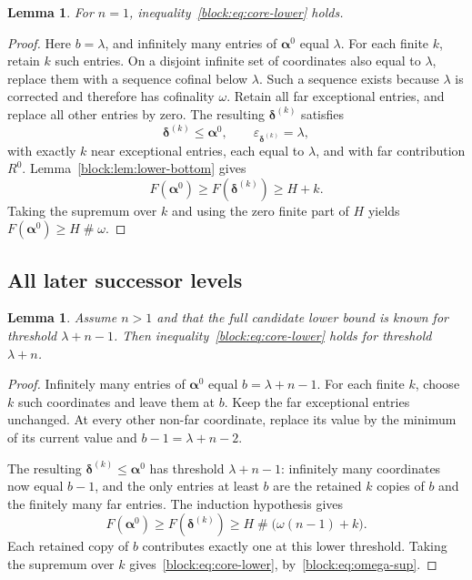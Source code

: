 \documentclass[11pt,a4paper]{article}
\newtheorem{lemma}[theorem]{Lemma}
\theoremstyle{definition}
\newcommand{\ns}{\mathbin{\#}}
\newcommand{\seq}[1]{\boldsymbol{#1}}
\begin{document}
\begin{lemma}\label{block:lem:lower-first}
For $n=1$, inequality~\eqref{block:eq:core-lower} holds.
\end{lemma}
\begin{proof}
Here $b=\lambda$, and infinitely many entries of $\seq\alpha^0$ equal $\lambda$. For each finite $k$, retain $k$ such entries. On a disjoint infinite set of coordinates also equal to $\lambda$, replace them with a sequence cofinal below $\lambda$. Such a sequence exists because $\lambda$ is corrected and therefore has cofinality $\omega$. Retain all far exceptional entries, and replace all other entries by zero. The resulting $\seq\delta^{(k)}$ satisfies
\[
 \seq\delta^{(k)}\le\seq\alpha^0,\qquad
 \varepsilon_{\seq\delta^{(k)}}=\lambda,
\]
with exactly $k$ near exceptional entries, each equal to $\lambda$, and with far contribution $R^0$. Lemma~\ref{block:lem:lower-bottom} gives
\[
 F(\seq\alpha^0)\ge F(\seq\delta^{(k)})\ge H+k.
\]
Taking the supremum over $k$ and using the zero finite part of $H$ yields
$F(\seq\alpha^0)\ge H\ns\omega$.
\end{proof}

\subsection{All later successor levels}

\begin{lemma}\label{block:lem:lower-induction}
Assume $n>1$ and that the full candidate lower bound is known for threshold $\lambda+n-1$. Then inequality~\eqref{block:eq:core-lower} holds for threshold $\lambda+n$.
\end{lemma}
\begin{proof}
Infinitely many entries of $\seq\alpha^0$ equal $b=\lambda+n-1$. For each finite $k$, choose $k$ such coordinates and leave them at $b$. Keep the far exceptional entries unchanged. At every other non-far coordinate, replace its value by the minimum of its current value and $b-1=\lambda+n-2$.

The resulting $\seq\delta^{(k)}\le\seq\alpha^0$ has threshold $\lambda+n-1$: infinitely many coordinates now equal $b-1$, and the only entries at least $b$ are the retained $k$ copies of $b$ and the finitely many far entries. The induction hypothesis gives
\[
 F(\seq\alpha^0)\ge F(\seq\delta^{(k)})
     \ge H\ns\bigl(\omega(n-1)+k\bigr).
\]
Each retained copy of $b$ contributes exactly one at this lower threshold. Taking the supremum over $k$ gives~\eqref{block:eq:core-lower}, by~\eqref{block:eq:omega-sup}.
\end{proof}
\end{document}
